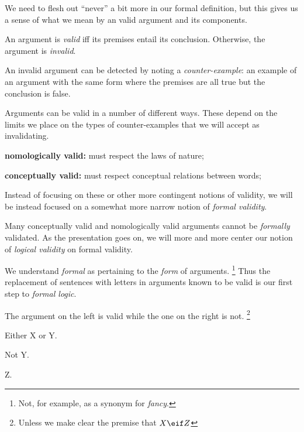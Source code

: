 We need to flesh out ``never'' a bit more in our formal definition, but this
gives us a sense of what we mean by an valid argument and its components.

\begin{definition}
  \label{def:informal-validity}
  An argument is \emph{valid} iff its premises entail its conclusion. Otherwise,
  the argument is \emph{invalid}.
\end{definition}

An invalid argument can be detected by noting a \emph{counter-example}: an
example of an argument with the same form where the premises are all true but
the conclusion is false.

Arguments can be valid in a number of different ways. These depend on the
limits we place on the types of counter-examples that we will accept as
invalidating.

\textbf{nomologically valid:} must respect the laws of nature;

\textbf{conceptually valid:} must respect conceptual relations between words;

Instead of focusing on these or other more contingent notions of validity, we
will be instead focused on a somewhat more narrow notion of
\emph{formal validity}.

Many conceptually valid and nomologically valid arguments cannot be
\emph{formally} validated. As the presentation goes on, we will more and more
center our notion of \emph{logical validity} on formal validity. 

We understand \emph{formal} as pertaining to the \emph{form} of arguments.
\footnote{Not, for example, as a synonym for \emph{fancy}.} Thus the
replacement of sentences with letters in arguments known to be valid is
our first step to \emph{formal logic}.

The argument on the left is valid while the one on the right is not.
\footnote{Unless we make clear the premise that $X\eif Z$}

 {
  \begin{argument}
  \item[] Either X or Y.
  \item[] Not Y.
  \item[\therefore] Z.
  \end{argument}
}

